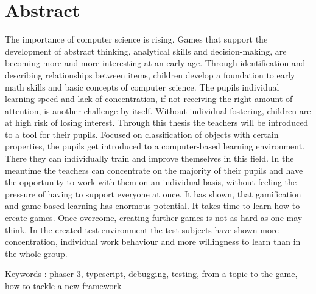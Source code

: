 
\chapter*{Abstract}
The importance of computer science is rising. Games that support the development of abstract thinking,
analytical skills and decision-making, are becoming more and more interesting at an early age.
Through identification and describing relationships between items, children develop a foundation to early
math skills and basic concepts of computer science.
The pupils individual learning speed and lack of concentration, if not receiving the right amount of attention,
is another challenge by itself.
Without individual fostering, children are at high risk of losing interest.
Through this thesis the teachers will be introduced to a tool for their pupils.
Focused on classification of objects with certain properties,
the pupils get introduced to a computer-based learning environment.
There they can individually train and improve themselves in this field.
In the meantime the teachers can concentrate on the majority of their pupils and have the opportunity to work with
them on an individual basis, without feeling the pressure of having to support everyone at once.
It has shown, that gamification and game based learning has enormous potential.
It takes time to learn how to create games. Once overcome, creating further games is not as hard as one may think.
In the created test environment the test subjects have shown more concentration,
individual work behaviour and more willingness to learn than in the whole group.

Keywords : phaser 3, typescript, debugging, testing, from a topic to the game, how to tackle a new framework

